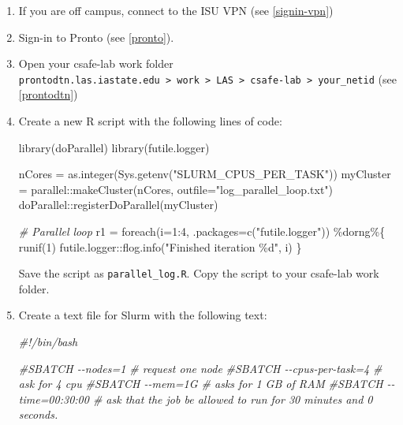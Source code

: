 \documentclass[
]{book}
\newenvironment{Shaded}{\begin{snugshade}}{\end{snugshade}}
\newcommand{\AttributeTok}[1]{\textcolor[rgb]{0.77,0.63,0.00}{#1}}
\newcommand{\CommentTok}[1]{\textcolor[rgb]{0.56,0.35,0.01}{\textit{#1}}}
\newcommand{\DecValTok}[1]{\textcolor[rgb]{0.00,0.00,0.81}{#1}}
\newcommand{\FunctionTok}[1]{\textcolor[rgb]{0.00,0.00,0.00}{#1}}
\newcommand{\NormalTok}[1]{#1}
\newcommand{\OtherTok}[1]{\textcolor[rgb]{0.56,0.35,0.01}{#1}}
\newcommand{\SpecialCharTok}[1]{\textcolor[rgb]{0.00,0.00,0.00}{#1}}
\newcommand{\StringTok}[1]{\textcolor[rgb]{0.31,0.60,0.02}{#1}}
\begin{document}
\begin{enumerate}
\def\labelenumi{\arabic{enumi}.}
\item
  If you are off campus, connect to the ISU VPN (see \ref{signin-vpn})
\item
  Sign-in to Pronto (see \ref{pronto}).
\item
  Open your csafe-lab work folder \texttt{prontodtn.las.iastate.edu\ \textgreater{}\ work\ \textgreater{}\ LAS\ \textgreater{}\ csafe-lab\ \textgreater{}\ your\_netid} (see \ref{prontodtn})
\item
  Create a new R script with the following lines of code:

\begin{Shaded}
\begin{Highlighting}[]
  \FunctionTok{library}\NormalTok{(doParallel)}
  \FunctionTok{library}\NormalTok{(futile.logger)}

\NormalTok{  nCores }\OtherTok{=} \FunctionTok{as.integer}\NormalTok{(}\FunctionTok{Sys.getenv}\NormalTok{(}\StringTok{"SLURM\_CPUS\_PER\_TASK"}\NormalTok{))}
\NormalTok{  myCluster }\OtherTok{=}\NormalTok{ parallel}\SpecialCharTok{::}\FunctionTok{makeCluster}\NormalTok{(nCores, }\AttributeTok{outfile=}\StringTok{"log\_parallel\_loop.txt"}\NormalTok{)}
\NormalTok{  doParallel}\SpecialCharTok{::}\FunctionTok{registerDoParallel}\NormalTok{(myCluster)}

  \CommentTok{\# Parallel loop}
\NormalTok{  r1 }\OtherTok{=} \FunctionTok{foreach}\NormalTok{(}\AttributeTok{i=}\DecValTok{1}\SpecialCharTok{:}\DecValTok{4}\NormalTok{, }\AttributeTok{.packages=}\FunctionTok{c}\NormalTok{(}\StringTok{"futile.logger"}\NormalTok{)) }\SpecialCharTok{\%dorng\%}\NormalTok{\{ }
\FunctionTok{runif}\NormalTok{(}\DecValTok{1}\NormalTok{) }
\NormalTok{futile.logger}\SpecialCharTok{::}\FunctionTok{flog.info}\NormalTok{(}\StringTok{"Finished iteration \%d"}\NormalTok{, i)}
\NormalTok{  \}}
\end{Highlighting}
\end{Shaded}

  Save the script as \texttt{parallel\_log.R}. Copy the script to your csafe-lab work folder.
\item
  Create a text file for Slurm with the following text:

\begin{Shaded}
\begin{Highlighting}[]
\CommentTok{\#!/bin/bash}

\CommentTok{\#SBATCH {-}{-}nodes=1 \# request one node}
\CommentTok{\#SBATCH {-}{-}cpus{-}per{-}task=4  \# ask for 4 cpu}
\CommentTok{\#SBATCH {-}{-}mem=1G \#  asks for 1 GB of RAM}
\CommentTok{\#SBATCH {-}{-}time=00:30:00 \# ask that the job be allowed to run for 30 minutes and 0 seconds.}


\end{Highlighting}
\end{Shaded}
\end{enumerate}
\end{document}
